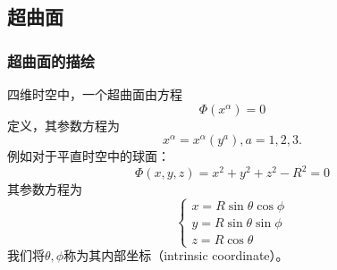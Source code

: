 \documentclass[hyperref, UTF8, a4paper]{ctexart}
\begin{document}
\subsection{超曲面}
\subsubsection{超曲面的描绘}

四维时空中，一个超曲面由方程
\begin{equation*}
	\Phi (x^{\alpha } )=0
\end{equation*}
定义，其参数方程为
\begin{equation*}
	x^{\alpha } =x^{\alpha } (y^{a} ),a=1,2,3.
\end{equation*}
例如对于平直时空中的球面：
\begin{equation*}
	\Phi ( x,y,z) =x^{2} +y^{2} +z^{2} -R^{2} =0
\end{equation*}
其参数方程为
\begin{equation*}
	\begin{cases}
		x=R\sin \theta \cos \phi \\
		y=R\sin \theta \sin \phi \\
		z=R\cos \theta 
	\end{cases}
\end{equation*}
我们将$\displaystyle \theta ,\phi $称为其内部坐标（intrinsic coordinate）。
\end{document}
